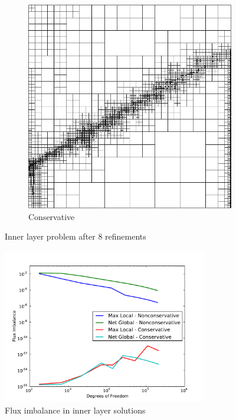 \documentclass[letterpaper]{article}
\begin{document}
\begin{figure}[p]
\begin{subfigure}[t]{0.45\textwidth}
\includegraphics[width=\textwidth]{figs/InnerLayer/modified8c_mesh.png}
\caption{Conservative}
\label{fig:innerlayer8c}
\end{subfigure}
\caption{Inner layer problem after 8 refinements}
\label{fig:innerlayer}
\end{figure}

\begin{figure}[p]
\centering
\includegraphics[width=0.8\textwidth]{figs/InnerLayer/modifiedFlux.pdf}
\caption{Flux imbalance in inner layer solutions}
\label{fig:innerlayer_flux}
\end{figure}
\end{document}
